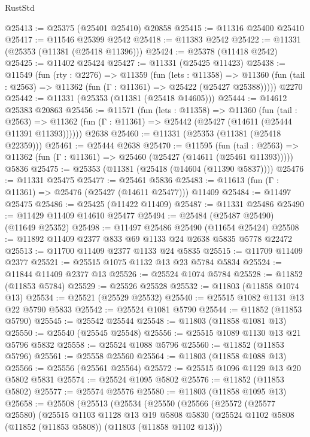 \begin{lexlean}{RustStd}
\begin{coremodule}
@25413 := @25375 (@25401 @25410) @20858
@25415 := @11316 @25400 @25410
@25417 := @11546 @25399 @2542
@25418 := @11383 @2542
@25422 := @11331 (@25353 (@11381 (@25418 @11396)))
@25424 := @25378 (@11418 @2542)
@25425 := @11402 @25424
@25427 := @11331 (@25425 @11423)
@25438 := @11549
    (fun (rty : @2276) =>
    @11359
      (fun (lets : @11358) =>
      @11360 (fun (tail : @2563) => @11362 (fun (Γ : @11361) => @25422 (@25427 @25388)))))
    @2270
@25442 := @11331 (@25353 (@11381 (@25418 @14605)))
@25444 := @14612 @25383 @20863
@25456 := @11571
    (fun (lets : @11358) =>
    @11360
      (fun (tail : @2563) =>
      @11362 (fun (Γ : @11361) => @25442 (@25427 (@14611 (@25444 @11391 @11393))))))
    @2638
@25460 := @11331 (@25353 (@11381 (@25418 @22359)))
@25461 := @25444 @2638
@25470 := @11595
    (fun (tail : @2563) => @11362 (fun (Γ : @11361) => @25460 (@25427 (@14611 (@25461 @11393)))))
    @5836
@25475 := @25353 (@11381 (@25418 (@14604 (@11390 @5837))))
@25476 := @11331 @25475
@25477 := @25461 @5836
@25483 := @11613 (fun (Γ : @11361) => @25476 (@25427 (@14611 @25477))) @11409
@25484 := @11497 @25475
@25486 := @25425 (@11422 @11409)
@25487 := @11331 @25486
@25490 := @11429 @11409 @14610 @25477
@25494 := @25484 (@25487 @25490) (@11649 @25352)
@25498 := @11497 @25486 @25490 (@11654 @25424)
@25508 := @11892 @11409 @2377 @833 @69 @1133 @24 @2638 @5835 @5778 @22472
@25513 := @11700 @11409 @2377 @1133 @24 @5835
@25515 := @11709 @11409 @2377
@25521 := @25515 @1075 @1132 @13 @23 @5784 @5834
@25524 := @11844 @11409 @2377 @13
@25526 := @25524 @1074 @5784
@25528 := @11852 (@11853 @5784)
@25529 := @25526 @25528
@25532 := @11803 (@11858 @1074 @13)
@25534 := @25521 (@25529 @25532)
@25540 := @25515 @1082 @1131 @13 @22 @5790 @5833
@25542 := @25524 @1081 @5790
@25544 := @11852 (@11853 @5790)
@25545 := @25542 @25544
@25548 := @11803 (@11858 @1081 @13)
@25550 := @25540 (@25545 @25548)
@25556 := @25515 @1089 @1130 @13 @21 @5796 @5832
@25558 := @25524 @1088 @5796
@25560 := @11852 (@11853 @5796)
@25561 := @25558 @25560
@25564 := @11803 (@11858 @1088 @13)
@25566 := @25556 (@25561 @25564)
@25572 := @25515 @1096 @1129 @13 @20 @5802 @5831
@25574 := @25524 @1095 @5802
@25576 := @11852 (@11853 @5802)
@25577 := @25574 @25576
@25580 := @11803 (@11858 @1095 @13)
@25658 := @25508
    (@25513
      (@25534
        (@25550
          (@25566
            (@25572
              (@25577 @25580)
              (@25515
                @1103
                @1128
                @13
                @19
                @5808
                @5830
                (@25524 @1102 @5808 (@11852 (@11853 @5808)) (@11803 (@11858 @1102 @13)))

\end{coremodule}
\end{lexlean}
